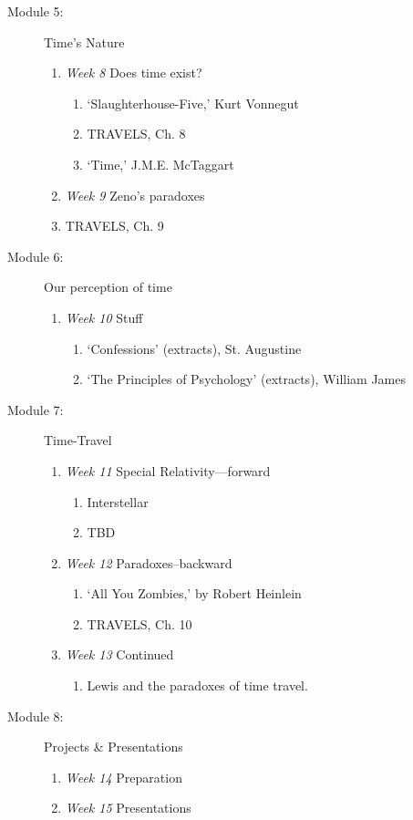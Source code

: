 \documentclass[article,oneside]{memoir}
\begin{document}
\begin{description}
\item[Module 5:] Time's Nature
\begin{enumerate}
\item \textit{Week 8} Does time exist? 
\begin{enumerate}
\item `Slaughterhouse-Five,' Kurt Vonnegut
\item TRAVELS, Ch. 8
\item  `Time,' J.M.E. McTaggart 
\end{enumerate}
\item \textit{Week 9} Zeno's paradoxes
\item TRAVELS, Ch. 9
\end{enumerate}


\item[Module 6:] Our perception of time
\begin{enumerate}
\item \textit{Week 10} Stuff
\begin{enumerate}
\item `Confessions' (extracts),  St. Augustine
\item `The Principles of Psychology' (extracts), William James
\end{enumerate}
\end{enumerate}

\item[Module 7:] Time-Travel
\begin{enumerate}
\item \textit{Week 11}  Special Relativity---forward
\begin{enumerate}
\item Interstellar
\item TBD
\end{enumerate}
\item \textit{Week 12}  Paradoxes--backward
\begin{enumerate}
\item `All You Zombies,' by Robert Heinlein
\item TRAVELS, Ch. 10 
\end{enumerate}
\item  \textit{Week 13} Continued
\begin{enumerate}
\item Lewis and the paradoxes of time travel.
\end{enumerate}
\end{enumerate}

\item[Module 8:] Projects \& Presentations
\begin{enumerate}
\item \textit{Week 14} Preparation
\item \textit{Week 15} Presentations
\end{enumerate}
 \end{description}
\end{document}
